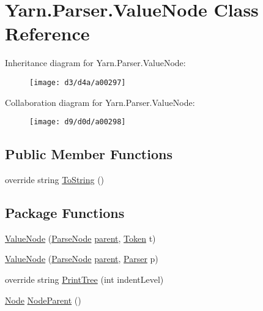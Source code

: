 \hypertarget{a00087}{\section{Yarn.\-Parser.\-Value\-Node Class Reference}
\label{a00087}
}


Inheritance diagram for Yarn.\-Parser.\-Value\-Node\-:
\nopagebreak
\begin{figure}[H]
\begin{center}
\leavevmode
\texttt{[image: d3/d4a/a00297]}
\end{center}
\end{figure}


Collaboration diagram for Yarn.\-Parser.\-Value\-Node\-:
\nopagebreak
\begin{figure}[H]
\begin{center}
\leavevmode
\texttt{[image: d9/d0d/a00298]}
\end{center}
\end{figure}
\subsection*{Public Member Functions}
\begin{DoxyCompactItemize}
\item 
override string \hyperlink{a00063_a18c67cb16090d0889bb9d6c8c6c565f8}{To\-String} ()
\end{DoxyCompactItemize}
\subsection*{Package Functions}
\begin{DoxyCompactItemize}
\item 
\hyperlink{a00087_a4d2911dde809291a8615262b9b0b4b46}{Value\-Node} (\hyperlink{a00063}{Parse\-Node} \hyperlink{a00063_af313a82103fcc2ff5a177dbb06b92f7b}{parent}, \hyperlink{a00079}{Token} t)
\item 
\hyperlink{a00087_ac63fbe99131dc3b42af16a2d087c0655}{Value\-Node} (\hyperlink{a00063}{Parse\-Node} \hyperlink{a00063_af313a82103fcc2ff5a177dbb06b92f7b}{parent}, \hyperlink{a00064}{Parser} p)
\item 
override string \hyperlink{a00087_ae4659e4431e9846a45e0d048c960781a}{Print\-Tree} (int indent\-Level)
\item 
\hyperlink{a00054}{Node} \hyperlink{a00063_a580e520a29444fc23ac3660cbe514a09}{Node\-Parent} ()
\end{DoxyCompactItemize}
